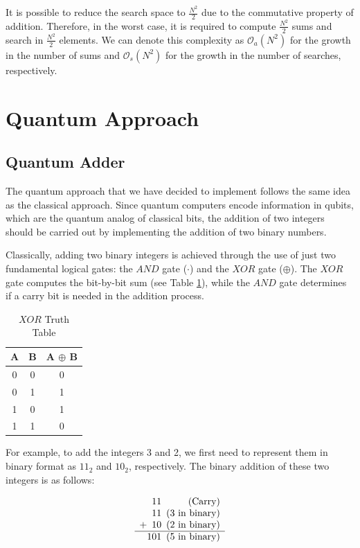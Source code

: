 \documentclass[aps,prapplied,longbibliography]{article}
\begin{document}
    It is possible to reduce the search space to $\frac{N^{2}}{2}$ due to the commutative property of addition. Therefore, in the worst case, it is required to compute $\frac{N^{2}}{2}$ sums and search in $\frac{N^2}{2}$ elements. We can denote this complexity as $\mathcal{O}_{a}(N^2)$ for the growth in the number of sums and $\mathcal{O}_s(N^2)$ for the growth in the number of searches, respectively.

    \section{Quantum Approach}

    \subsection{Quantum Adder}

    The quantum approach that we have decided to implement follows the same idea as the classical approach. Since quantum computers encode information in qubits, which are the quantum analog of classical bits, the addition of two integers should be carried out by implementing the addition of two binary numbers.

    Classically, adding two binary integers is achieved through the use of just two fundamental logical gates: the $AND$ gate ($\cdot$) and the $XOR$ gate ($\oplus$). The $XOR$ gate computes the bit-by-bit sum (see Table \ref{tab:XOR}), while the $AND$ gate determines if a carry bit is needed in the addition process.

    \begin{table}[h]
        \centering
        \caption{$XOR$ Truth Table}
        \label{tab:XOR}
        \begin{tabular}{cc|c}
            A & B & A $\oplus$ B \\
            \hline
            0 & 0 & 0 \\
            0 & 1 & 1 \\
            1 & 0 & 1 \\
            1 & 1 & 0 \\
            \hline
        \end{tabular}
    \end{table}

    For example, to add the integers 3 and 2, we first need to represent them in binary format as $11_2$ and $10_2$, respectively. The binary addition of these two integers is as follows:

    \begin{equation}
        \begin{array}{c@{}c@{}c@{}c@{\hspace{0.5em}}r}
            &   & 1 & 1 & {\text{(Carry)}} \\
            &   & 1 & 1 & \text{(3 in binary)} \\
          + &   & 1 & 0 & \text{(2 in binary)} \\
          \hline
            & 1 & 0 & 1 & \text{(5 in binary)}
        \end{array}
    \end{equation}
\end{document}
